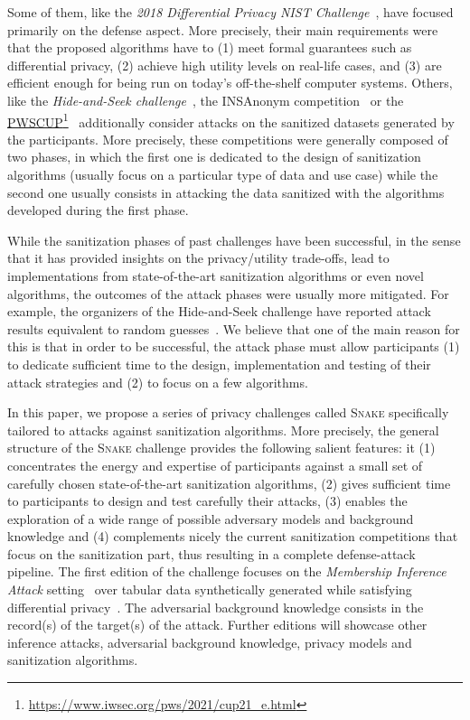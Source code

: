 \documentclass{article}
\newcommand{\myhref}[2]{\href{#1}{#2}\footnote{\url{#1}}}
\newcommand{\name}{\textsc{Snake}\xspace}
\begin{document}
Some of them, like the \emph{2018 Differential Privacy NIST Challenge}~\cite{ridgeway2021}, have focused primarily on the defense aspect.
More precisely, their main requirements were that the proposed algorithms have to (1) meet formal guarantees such as differential privacy, (2) achieve high utility levels on real-life cases, and (3) are efficient enough for being run on today's off-the-shelf computer systems.
Others, like the \emph{Hide-and-Seek challenge}~\cite{haspc2021}, the INSAnonym competition~\cite{boutet:hal-02512677} or the \myhref{https://www.iwsec.org/pws/2021/cup21_e.html}{PWSCUP}~\cite{pwscup2021} additionally consider attacks on the sanitized datasets generated by the participants.
More precisely, these competitions were generally composed of two phases, in which the first one is dedicated to the design of sanitization algorithms (usually focus on a particular type of data and use case) while the second one usually consists in attacking the data sanitized with the algorithms developed during the first phase.

While the sanitization phases of past challenges have been successful, in the sense that it has provided insights on the privacy/utility trade-offs, lead to implementations from state-of-the-art sanitization algorithms or even novel algorithms, the outcomes of the attack phases were usually more mitigated.
For example, the organizers of the Hide-and-Seek challenge have reported attack results equivalent to random guesses~\cite{haspc2021}.
We believe that one of the main reason for this is that in order to be successful, the attack phase must allow participants (1) to dedicate sufficient time to the design, implementation and testing of their attack strategies and (2) to focus on a few algorithms.

In this paper, we propose a series of privacy challenges called \name specifically tailored to attacks against sanitization algorithms.
More precisely, the general structure of the \name challenge provides the following salient features: it (1) concentrates the energy and expertise of participants against a small set of carefully chosen state-of-the-art sanitization algorithms, (2) gives sufficient time to participants to design and test carefully their attacks, (3) enables the exploration of a wide range of possible adversary models and background knowledge and (4) complements nicely the current sanitization competitions that focus on the sanitization part, thus resulting in a complete defense-attack pipeline.
The first edition of the challenge focuses on the \emph{Membership Inference Attack} setting~\cite{Hu2021MembershipIA,Stadler2020SyntheticD} over tabular data synthetically generated while satisfying differential privacy~\cite{Dwork2014TheAF}.
The adversarial background knowledge consists in the record(s) of the target(s) of the attack.
Further editions will showcase other inference attacks, adversarial
background knowledge, privacy models and sanitization algorithms.
\end{document}
